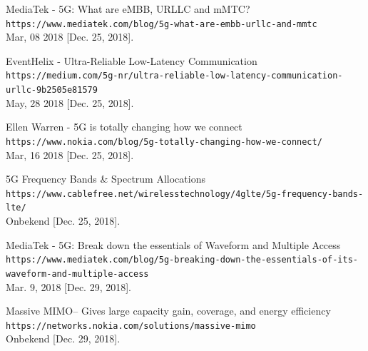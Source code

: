 \documentclass{article}
\begin{document}
\begin{thebibliography}{9}
MediaTek - 5G: What are eMBB, URLLC and mMTC?\\
\texttt{https://www.mediatek.com/blog/5g-what-are-embb-urllc-and-mmtc} \\
Mar, 08 2018 [Dec. 25, 2018].

EventHelix - Ultra-Reliable Low-Latency Communication\\
\texttt{https://medium.com/5g-nr/ultra-reliable-low-latency-communication-\\urllc-9b2505e81579}\\ May, 28 2018 [Dec. 25, 2018].

Ellen Warren - 5G is totally changing how we connect\\
\texttt{https://www.nokia.com/blog/5g-totally-changing-how-we-connect/} \\
Mar, 16 2018 [Dec. 25, 2018].

5G Frequency Bands \& Spectrum Allocations\\
\texttt{https://www.cablefree.net/wirelesstechnology/4glte/5g-frequency-bands-lte/} \\Onbekend [Dec. 25, 2018].

MediaTek - 5G: Break down the essentials of Waveform and Multiple Access\\
\texttt{https://www.mediatek.com/blog/5g-breaking-down-the-essentials-of-its-\\waveform-and-multiple-access} \\
Mar. 9, 2018 [Dec. 29, 2018].

Massive MIMO– Gives large capacity gain, coverage, and energy efficiency\\
\texttt{https://networks.nokia.com/solutions/massive-mimo} \\
Onbekend [Dec. 29, 2018].



\end{thebibliography}
\end{document}

